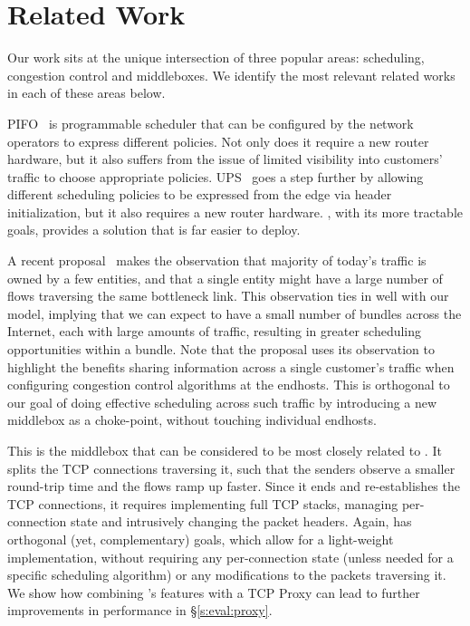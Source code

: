 \section{Related Work}
\label{s:related}

Our work sits at the unique intersection of three popular areas: scheduling, congestion control and middleboxes. We identify the most relevant related works in each of these areas below. 

 PIFO~\cite{pifo} is programmable scheduler that can be configured by the network operators to express different policies. Not only does it require a new router hardware, but it also suffers from the issue of limited visibility into customers' traffic to choose appropriate policies. UPS~\cite{ups} goes a step further by allowing different scheduling policies to be expressed from the edge via header initialization, 
but it also requires a new router hardware. \name, with its more tractable goals, provides a solution that is far easier to deploy. 

 A recent proposal~\cite{fivecomps} makes the observation that majority of today's traffic is owned by a few entities, and that a single entity might have a large number of flows traversing the same bottleneck link. This observation ties in well with our model, implying that we can expect to have a small number of bundles across the Internet, each with large amounts of traffic, resulting in greater scheduling opportunities within a bundle. Note that the proposal uses its observation to highlight the benefits sharing information across a single customer's traffic when configuring congestion control algorithms at the endhosts. This is orthogonal to our goal of doing effective scheduling across such traffic by introducing a new middlebox as a choke-point, without touching individual endhosts. 

 This is the middlebox that can be considered to be most closely related to \name. It splits the TCP connections traversing it, such that the senders observe a smaller round-trip time and the flows ramp up faster. Since it ends and re-establishes the TCP connections, it requires implementing full TCP stacks, managing per-connection state and intrusively changing the packet headers. Again, \name has orthogonal (yet, complementary) goals, which allow for a light-weight implementation, without requiring any per-connection state (unless needed for a specific scheduling algorithm) or any modifications to the packets traversing it. We show how combining \name's features with a TCP Proxy can lead to further improvements in performance in \S\ref{s:eval:proxy}. 

